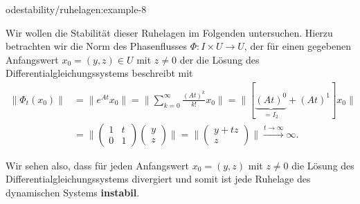 \documentclass[letterpaper,10pt,german]{jupyterBook}
\begin{document}
\begin{example}{}{odestability/ruhelagen:example-8}
\par
Wir wollen die Stabilität dieser Ruhelagen im Folgenden untersuchen.
Hierzu betrachten wir die Norm des Phasenflusses \(\Phi \colon I \times U \rightarrow U\), der für einen gegebenen Anfangswert \(x_0 = (y,z) \in U\) mit \(z \neq 0\) der die Lösung des Differentialgleichungssystems beschreibt mit
\begin{align*}
\| \Phi_t(x_0) \| &= \| e^{At}x_0 \| = \| \sum_{k=0}^\infty \frac{(At)^k}{k!} x_0\| = \| [\underbrace{(At)^0}_{=I_2} + (At)^1] x_0\| \\
&= \| \begin{pmatrix} 1 & t \\ 0 & 1\end{pmatrix}\begin{pmatrix} y \\ z \end{pmatrix} \| = \| \begin{pmatrix} y + tz \\ z\end{pmatrix} \| \overset{t\to \infty}{\longrightarrow} \infty.
\end{align*}
\par
Wir sehen also, dass für jeden Anfangswert \(x_0 = (y,z)\) mit \(z \neq 0\) die Lösung des Differentialgleichungssystems divergiert und somit ist jede Ruhelage des dynamischen Systems \textbf{instabil}.
\end{example}
\end{document}
